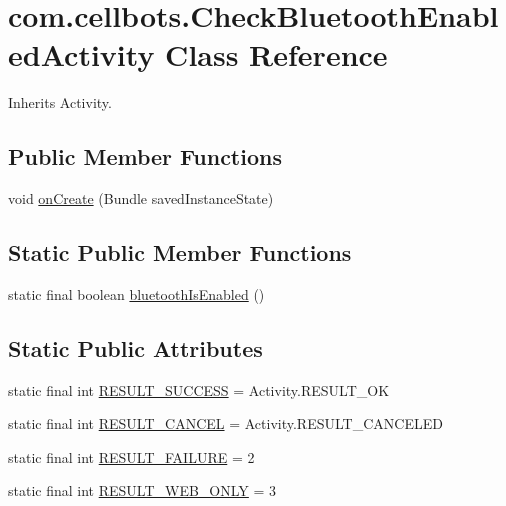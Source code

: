 \hypertarget{classcom_1_1cellbots_1_1_check_bluetooth_enabled_activity}{\section{com.\-cellbots.\-Check\-Bluetooth\-Enabled\-Activity Class Reference}
\label{classcom_1_1cellbots_1_1_check_bluetooth_enabled_activity}
}


Inherits Activity.

\subsection*{Public Member Functions}
\begin{DoxyCompactItemize}
\item 
void \hyperlink{classcom_1_1cellbots_1_1_check_bluetooth_enabled_activity_a649c6658034bc73be616e38099deb451}{on\-Create} (Bundle saved\-Instance\-State)
\end{DoxyCompactItemize}
\subsection*{Static Public Member Functions}
\begin{DoxyCompactItemize}
\item 
static final boolean \hyperlink{classcom_1_1cellbots_1_1_check_bluetooth_enabled_activity_aae0c92a32d1ed32d112b658131cb962e}{bluetooth\-Is\-Enabled} ()
\end{DoxyCompactItemize}
\subsection*{Static Public Attributes}
\begin{DoxyCompactItemize}
\item 
static final int \hyperlink{classcom_1_1cellbots_1_1_check_bluetooth_enabled_activity_aa61b22e8423e1033756f2099218ed19d}{R\-E\-S\-U\-L\-T\-\_\-\-S\-U\-C\-C\-E\-S\-S} = Activity.\-R\-E\-S\-U\-L\-T\-\_\-\-O\-K
\item 
static final int \hyperlink{classcom_1_1cellbots_1_1_check_bluetooth_enabled_activity_a52c122a3d9fc19b0fc7029149ece056f}{R\-E\-S\-U\-L\-T\-\_\-\-C\-A\-N\-C\-E\-L} = Activity.\-R\-E\-S\-U\-L\-T\-\_\-\-C\-A\-N\-C\-E\-L\-E\-D
\item 
static final int \hyperlink{classcom_1_1cellbots_1_1_check_bluetooth_enabled_activity_a76e42a4f519c72fa1d2d143e6ab7b22e}{R\-E\-S\-U\-L\-T\-\_\-\-F\-A\-I\-L\-U\-R\-E} = 2
\item 
static final int \hyperlink{classcom_1_1cellbots_1_1_check_bluetooth_enabled_activity_ae8c3d95959c9b97451b618f01d61e860}{R\-E\-S\-U\-L\-T\-\_\-\-W\-E\-B\-\_\-\-O\-N\-L\-Y} = 3
\end{DoxyCompactItemize}


